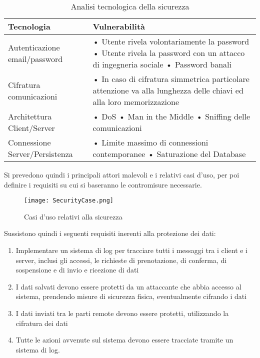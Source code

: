 \begin{table}[htbp]
    \centering
    \begin{tabular} {|P{4cm}|P{12cm}|}
        \hline
        Tecnologia                     & Vulnerabilità                                            \\
        \hline
        Autenticazione email/password  & • Utente rivela volontariamente la password \linebreak
        • Utente rivela la password con un attacco di ingegneria sociale \linebreak
        • Password banali                                                                         \\
        \hline
        Cifratura comunicazioni        & • In caso di cifratura simmetrica particolare
        attenzione va alla lunghezza delle chiavi ed alla loro memorizzazione                     \\
        \hline
        Architettura Client/Server     & • DoS \linebreak
        • Man in the Middle \linebreak
        • Sniffing delle comunicazioni                                                            \\
        \hline
        Connessione Server/Persistenza & • Limite massimo di connessioni contemporanee \linebreak
        • Saturazione del Database                                                                \\
        \hline
    \end{tabular}
    \caption{Analisi tecnologica della sicurezza}
    \label{<label>}
\end{table}

\clearpage
Si prevedono quindi i principali attori malevoli e i relativi casi d'uso, per poi definire i requisiti su cui si baseranno le contromisure necessarie.
\begin{figure}[h!]
    \begin{center}
        \texttt{[image: SecurityCase.png]}
        \caption{Casi d'uso relativi alla sicurezza}
    \end{center}

\end{figure}
\clearpage

Sussistono quindi i seguenti requisiti inerenti alla protezione dei dati:
\begin{enumerate}
    \item Implementare un sistema di log per tracciare tutti i messaggi tra i client e i server, inclusi gli accessi, le richieste di prenotazione, di conferma, di sospensione e di invio e ricezione di dati
    \item I dati salvati devono essere protetti da un attaccante che abbia accesso al sistema, prendendo misure di sicurezza fisica, eventualmente cifrando i dati
    \item I dati inviati tra le parti remote devono essere protetti, utilizzando la cifratura dei dati
    \item Tutte le azioni avvenute sul sistema devono essere tracciate tramite un sistema di log.
\end{enumerate}

